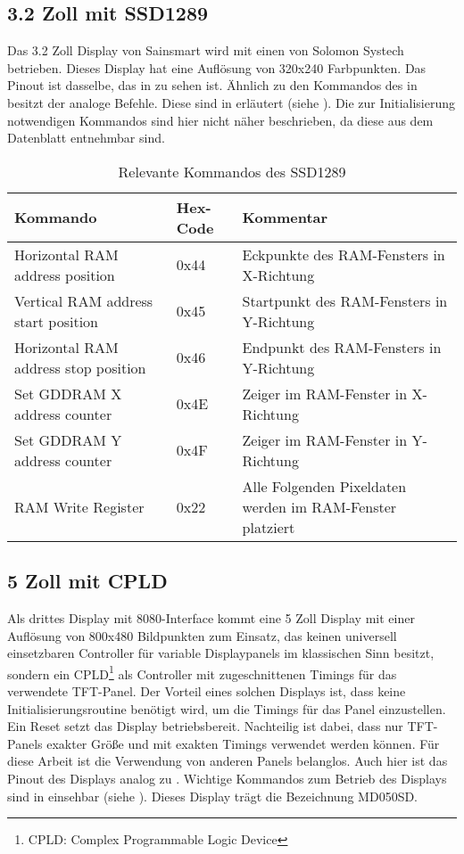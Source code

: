 \subsection{3.2 Zoll mit SSD1289}
Das 3.2 Zoll Display von Sainsmart wird mit einen  von Solomon Systech betrieben. Dieses Display hat eine Auflösung von 320x240 Farbpunkten. Das Pinout ist dasselbe, das in  zu sehen ist. Ähnlich zu den Kommandos des  in  besitzt der  analoge Befehle. Diese sind in   erläutert (siehe \cite{SSD2007}). Die zur Initialisierung notwendigen Kommandos sind hier nicht näher beschrieben, da diese aus dem Datenblatt entnehmbar sind.
\begin{table}[h]
\begin{tabular}{|p{4cm}|p{1cm}|p{8cm}|}\hline
\rowcolor{TableBackgroundColor}
   \textbf{Kommando} & \textbf{Hex-Code} & \textbf{Kommentar}\\ \hline
   Horizontal RAM address position & 0x44 & Eckpunkte des RAM-Fensters in X-Richtung \\ \hline
   Vertical RAM address start position & 0x45 & Startpunkt des RAM-Fensters in Y-Richtung \\ \hline
   Horizontal RAM address stop position & 0x46 & Endpunkt des  RAM-Fensters in Y-Richtung \\ \hline
   Set GDDRAM X address counter & 0x4E & Zeiger im  RAM-Fenster in X-Richtung \\ \hline
   Set GDDRAM Y address counter & 0x4F & Zeiger im RAM-Fenster in Y-Richtung \\ \hline
   RAM Write  Register & 0x22 & Alle Folgenden Pixeldaten werden im RAM-Fenster platziert \\ \hline
\end{tabular}
\caption{Relevante Kommandos des SSD1289}
\label{tab:Kommandos_SSD1289}
\end{table}


\subsection{5 Zoll mit CPLD}
Als drittes Display mit 8080-Interface kommt eine 5 Zoll Display mit einer Auflösung von 800x480 Bildpunkten zum Einsatz, das keinen universell einsetzbaren Controller für variable Displaypanels im klassischen Sinn besitzt, sondern ein CPLD\footnote{CPLD: Complex Programmable Logic Device} als Controller mit zugeschnittenen Timings für das verwendete TFT-Panel. Der Vorteil eines solchen Displays ist, dass keine Initialisierungsroutine benötigt wird, um die Timings für das Panel einzustellen. Ein Reset setzt das Display betriebsbereit. Nachteilig ist dabei, dass nur TFT-Panels exakter Größe und mit exakten Timings verwendet werden können. Für diese Arbeit ist die Verwendung von anderen Panels belanglos. Auch hier ist das Pinout des Displays analog zu .\newline
Wichtige Kommandos zum Betrieb des Displays sind in  einsehbar (siehe \cite{ITEAD2013}). Dieses Display trägt die Bezeichnung MD050SD.

